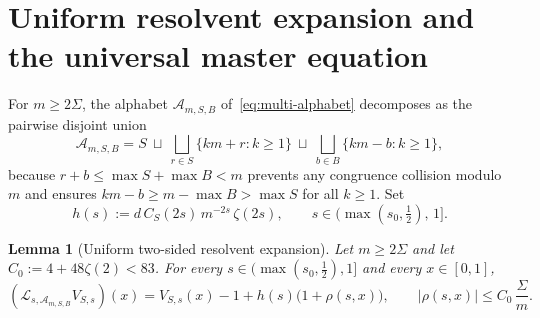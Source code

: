 \documentclass[11pt]{article}
\newtheorem{lemma}[theorem]{Lemma}
\theoremstyle{definition}
\theoremstyle{remark}
\begin{document}
\section{Uniform resolvent expansion and the universal master equation}\label{sec:master}

For $m\ge 2\Sigma$, the alphabet $\mathcal A_{m,S,B}$ of~\eqref{eq:multi-alphabet}
decomposes as the pairwise disjoint union
\begin{equation}\label{eq:disjoint-decomp}
\mathcal A_{m,S,B}
=S\ \sqcup\ \bigsqcup_{r\in S}\{km+r:k\ge1\}
\ \sqcup\ \bigsqcup_{b\in B}\{km-b:k\ge1\},
\end{equation}
because $r+b\le\max S+\max B<m$ prevents any congruence collision modulo~$m$
and ensures $km-b\ge m-\max B>\max S$ for all $k\ge1$. Set
\[
h(s):=d\,C_S(2s)\,m^{-2s}\,\zeta(2s),
\qquad s\in\bigl(\max(s_0,\tfrac12),\,1\bigr].
\]

\begin{lemma}[Uniform two-sided resolvent expansion]\label{lem:resolvent-uniform}
Let $m\ge 2\Sigma$ and let $C_0:=4+48\zeta(2)<83$. For every
$s\in(\max(s_0,\frac12),1]$ and every $x\in[0,1]$,
\begin{equation}\label{eq:resolvent-uniform-fixed}
(\mathcal L_{s,\mathcal A_{m,S,B}}V_{S,s})(x)
=V_{S,s}(x)-1+h(s)\bigl(1+\rho(s,x)\bigr),
\qquad |\rho(s,x)|\le C_0\,\frac{\Sigma}{m}.
\end{equation}
\end{lemma}
\end{document}
